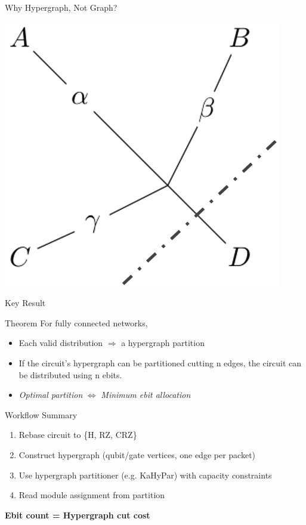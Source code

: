 \documentclass{beamer}
\begin{document}
\begin{frame}{Why Hypergraph, Not Graph?}
\begin{minipage}{.3\linewidth}
		\end{minipage}
		\begin{minipage}{.3\linewidth}
			\includegraphics[width=.9\textwidth]{figures/why3.png}
		\end{minipage}
	\end{frame}
	
	\begin{frame}{Key Result}
		\begin{block}{Theorem}
			For fully connected networks,
			\begin{itemize}
				\item Each valid distribution $\Rightarrow$ a hypergraph partition
				\item If the circuit’s hypergraph can be partitioned cutting n edges, the circuit can be distributed using n ebits.
				\item \textit{Optimal partition} $\Leftrightarrow$ \textit{Minimum ebit allocation}
			\end{itemize}
		\end{block}
	\end{frame}
	
	\begin{frame}{Workflow Summary}
		\begin{enumerate}
			\item Rebase circuit to \{H, RZ, CRZ\}
			\item Construct hypergraph (qubit/gate vertices, one edge per packet)
			\item Use hypergraph partitioner (e.g. KaHyPar) with capacity constraints
			\item Read module assignment from partition
		\end{enumerate}
		\vspace{0.5em}
		\textbf{Ebit count = Hypergraph cut cost}
	\end{frame}
	
\end{document}
